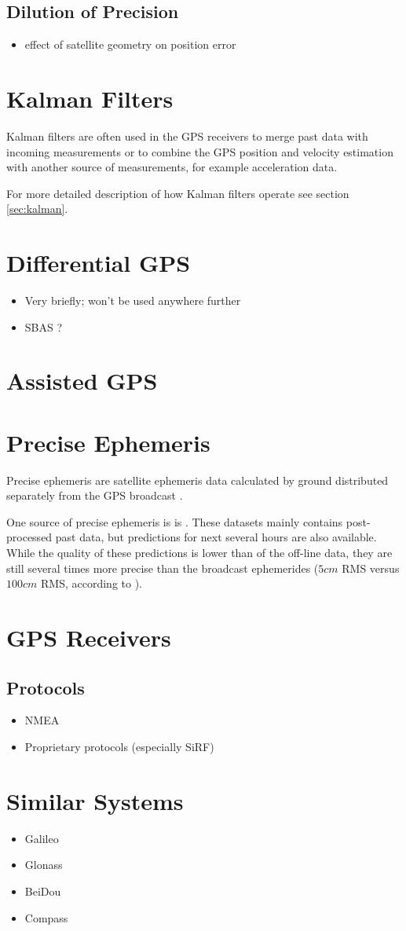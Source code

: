\subsection{Dilution of Precision}
\begin{itemize}
\item effect of satellite geometry on position error
\end{itemize}

\section{Kalman Filters}
Kalman filters are often used in the GPS receivers to merge past
data with incoming measurements or to combine the GPS position and velocity
estimation with another source of measurements, for example acceleration data.

For more detailed description of how Kalman filters operate see section
\ref{sec:kalman}.

\section{Differential GPS}
\begin{itemize}
\item Very briefly; won't be used anywhere further
\item SBAS ?
\end{itemize}

\section{Assisted GPS}

\section{Precise Ephemeris}
Precise ephemeris are satellite ephemeris data calculated by ground distributed
separately from the GPS broadcast \cite{macdonald01}.

One source of precise ephemeris is is \cite{orbit-data}.
These datasets mainly contains post-processed past data, but predictions for
next several hours are also available.
While the quality of these predictions is lower than of the off-line data,
they are still several times more precise than the broadcast ephemerides
(\(5 cm\) RMS versus \(100 cm\) RMS, according to \cite{orbit-data}).


\section{GPS Receivers}
\subsection{Protocols}
\begin{itemize}
\item NMEA
\item Proprietary protocols (especially SiRF)
\end{itemize}

\section{Similar Systems}
\begin{itemize}
\item Galileo
\item Glonass
\item BeiDou
\item Compass
\end{itemize}

